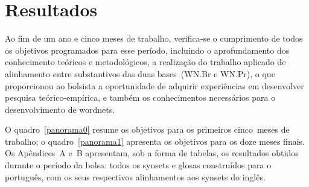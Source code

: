 \chapter{Resultados}


Ao fim de um ano e cinco meses de trabalho, verifica-se o cumprimento de todos
os objetivos programados para esse período, incluindo o aprofundamento dos
conhecimento teóricos e metodológicos, a realização do trabalho aplicado de
alinhamento entre substantivos das duas bases~(WN.Br e WN.Pr), o que
proporcionou ao bolsista a oportunidade de adquirir experiências em desenvolver
pesquisa teórico-empírica, e também os conhecimentos necessários para o
desenvolvimento de wordnets.
\enlargethispage{\baselineskip}

O quadro~\ref{panorama0} resume os objetivos para os primeiros cinco~meses de
trabalho; o quadro~\ref{panorama1} apresenta os objetivos para os doze meses
finais. Os Apêndices~A e~B apresentam, sob a forma de tabelas, os resultados
obtidos durante o período da bolsa: todos os synsets e glosas construídos para
o português, com os seus respectivos alinhamentos aos synsets do inglês.


